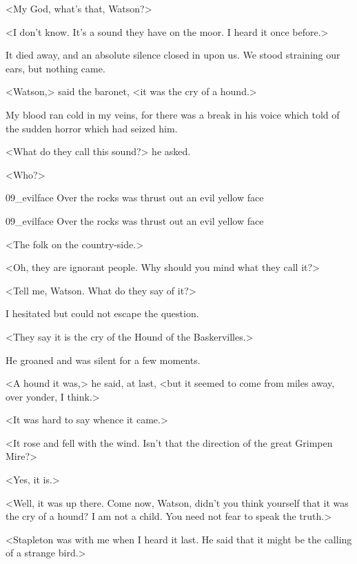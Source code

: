 <My God, what's that, Watson?>

<I don't know. It's a sound they have on the moor. I heard it once before.>

It died away, and an absolute silence closed in upon us. We stood straining our ears, but nothing came.

<Watson,> said the baronet, <it was the cry of a hound.>

My blood ran cold in my veins, for there was a break in his voice which told of the sudden horror which had seized him.

<What do they call this sound?> he asked.

<Who?>



\begin{a4}
	\begin{bwbigpic}
		[1.0] 
		{09_evilface}
		{Over the rocks was thrust out an evil yellow face}
	\end{bwbigpic}
\end{a4}

\begin{letter}
	\begin{bwbigpic}
			[1.0]  
		{09_evilface}
		{Over the rocks was thrust out an evil yellow face}
	\end{bwbigpic}
\end{letter}

<The folk on the country-side.>

<Oh, they are ignorant people. Why should you mind what they call it?>

 
<Tell me, Watson. What do they say of it?>

I hesitated but could not escape the question.

<They say it is the cry of the Hound of the Baskervilles.>

He groaned and was silent for a few moments.

<A hound it was,> he said, at last, <but it seemed to come from miles away, over yonder, I think.>

<It was hard to say whence it came.>

<It rose and fell with the wind. Isn't that the direction of the great Grimpen Mire?>

<Yes, it is.>

<Well, it was up there. Come now, Watson, didn't you think yourself that it was the cry of a hound? I am not a child. You need not fear to speak the truth.>

<Stapleton was with me when I heard it last. He said that it might be the calling of a strange bird.>

